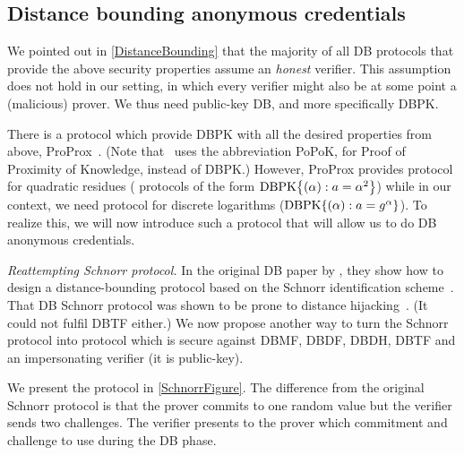 \subsection{Distance bounding anonymous credentials}%
\label{DB-anon-cred}


We pointed out in \cref{DistanceBounding} that the majority of all \ac{DB} protocols that provide the above security properties assume an \emph{honest} verifier.
This assumption does not hold in our setting, in which every verifier might also be at some point a (malicious) prover.
We thus need public-key \ac{DB}, and more specifically \ac{DBPK}.

There is a protocol which provide \ac{DBPK} with all the desired properties from 
above, ProProx~\cite{ProProx}.
(Note that~\cite{ProProx} uses the abbreviation PoPoK, for Proof of Proximity of 
Knowledge, instead of \ac{DBPK}.)
However, ProProx provides  protocol for quadratic residues (\ie 
protocols of the form \(\DBPK[\alpha][a = \alpha^2]\)) while in our context, we 
need  protocol for discrete logarithms (\ie \(\DBPK[\alpha][a = 
  g^\alpha]\)).
To realize this, we will now introduce such a protocol that will allow us to do 
\ac{DB} anonymous credentials.


\emph{Reattempting  Schnorr protocol.}
In the original \ac{DB} paper by \citet{DistanceBounding}, they show how to 
design a distance-bounding protocol based on the Schnorr identification 
scheme~\cite{Schnorr}.
That \ac{DB} Schnorr protocol was shown to be prone to distance 
hijacking~\cite{DistanceHijacking}.
(It could not fulfil \ac{DBTF} either.)
We now propose another way to turn the Schnorr protocol into  protocol 
which is secure against \ac{DBMF}, \ac{DBDF}, \ac{DBDH}, \ac{DBTF} and an 
impersonating verifier (\ie it is public-key).

We present the protocol in \cref{SchnorrFigure}.
The difference from the original Schnorr protocol is that the prover commits to 
one random value but the verifier sends two challenges.
The verifier presents to the prover which commitment and challenge to use 
during the \ac{DB} phase.

